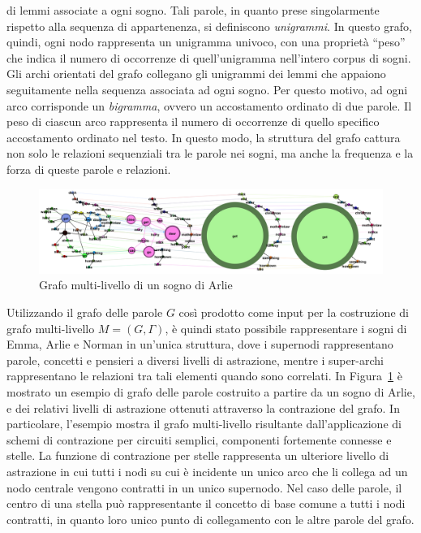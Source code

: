 \begin{enumerate}
          di lemmi associate a ogni sogno. Tali parole, in quanto prese singolarmente rispetto alla sequenza
          di appartenenza, si definiscono \textit{unigrammi}. In questo grafo, quindi, ogni nodo rappresenta
          un unigramma univoco, con una proprietà ``peso'' che indica il numero di occorrenze di quell'unigramma
          nell'intero corpus di sogni.
          Gli archi orientati del grafo collegano gli unigrammi dei lemmi che appaiono seguitamente nella
          sequenza associata ad ogni sogno.
          Per questo motivo, ad ogni arco corrisponde un \textit{bigramma}, ovvero un accostamento ordinato di due parole.
          Il peso di ciascun arco rappresenta il numero di occorrenze di quello specifico accostamento ordinato nel testo.
          In questo modo, la struttura del grafo cattura non solo le relazioni sequenziali tra le parole nei sogni,
          ma anche la frequenza e la forza di queste parole e relazioni.
\end{enumerate}

\begin{figure}[h!]
    \centering
    \includegraphics[width=1\textwidth]{Immagini/arlie_dream_graph_example}
    \caption{Grafo multi-livello di un sogno di Arlie}
    \label{fig:arlie-dream-graph}
\end{figure}

Utilizzando il grafo delle parole $G$ così prodotto come input per la costruzione di grafo multi-livello
$M = (G, \Gamma)$, è quindi stato possibile rappresentare i sogni di Emma, Arlie e Norman in un'unica struttura,
dove i supernodi rappresentano parole, concetti e pensieri a diversi livelli di astrazione, mentre i super-archi
rappresentano le relazioni tra tali elementi quando sono correlati.
In Figura~\ref{fig:arlie-dream-graph} è mostrato un esempio di grafo delle parole costruito a partire da un sogno di Arlie, e dei
relativi livelli di astrazione ottenuti attraverso la contrazione del grafo.
In particolare, l'esempio mostra il grafo multi-livello risultante dall'applicazione di schemi di contrazione per
circuiti semplici, componenti fortemente connesse e stelle.
La funzione di contrazione per stelle rappresenta un ulteriore livello di astrazione in cui tutti i nodi su cui è
incidente un unico arco che li collega ad un nodo centrale vengono contratti in un unico supernodo.
Nel caso delle parole, il centro di una stella può rappresentante il concetto di base comune a tutti i nodi contratti,
in quanto loro unico punto di collegamento con le altre parole del grafo.

